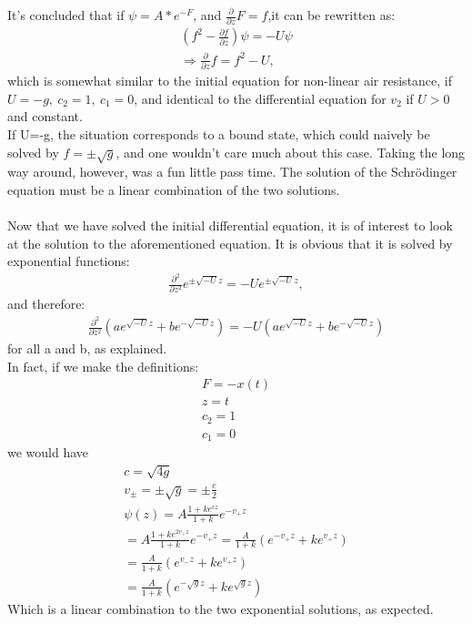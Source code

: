 \documentclass[english,a4paper,oneside,article,9pt]{memoir}
\begin{document}
It's concluded that if $\psi=A*e^{-F}$, and $\frac{\partial}{\partial z}F=f$,it can be rewritten as:
\begin{align*}
(f^2-\frac{\partial f}{\partial z})\psi=-U\psi\\
\Rightarrow \frac{\partial}{\partial z}f=f^2-U,
\end{align*}
which is somewhat similar to the initial equation for non-linear air resistance, if $U=-g,\ c_2=1,\ c_1=0$, and identical to the differential equation for $v_2$ if $U>0$ and constant.\\
If U=-g, the situation corresponds to a bound state, which could naively be solved by $f=\pm\sqrt{g}$, and one wouldn't care much about this case. Taking the long way around, however, was a fun little pass time. The solution of the Schrödinger equation must be a linear combination of the two solutions.\\
\\
Now that we have solved the initial differential equation, it is of interest to look at the solution to the aforementioned equation. It is obvious that it is solved by exponential functions:
\begin{align*}
\frac{\partial^2}{\partial z^2}e^{\pm\sqrt{-U}z}=-Ue^{\pm\sqrt{-U}z},
\end{align*}
and therefore:
\begin{align*}
\frac{\partial^2}{\partial z^2}(ae^{\sqrt{-U}z}+be^{-\sqrt{-U}z})=-U(ae^{\sqrt{-U}z}+be^{-\sqrt{-U}z})
\end{align*}
for all a and b, as explained.
\\
In fact, if we make the definitions:
\begin{align*}
F=-x(t)\\
z=t\\
c_2=1\\
c_1=0
\end{align*}
we would have
\begin{align*}
c=\sqrt{4g}\\
v_\pm=\pm\sqrt{g}=\pm\frac{c}{2}\\
\psi(z)=A\frac{1+ke^{cz}}{1+k}e^{-v_+z}\\
=A\frac{1+ke^{2v_+z}}{1+k}e^{-v_+z}=\frac{A}{1+k}(e^{-v_+z}+ke^{v_+z})\\
=\frac{A}{1+k}(e^{v_-z}+ke^{v_+z})\\
=\frac{A}{1+k}(e^{-\sqrt{g}z}+ke^{\sqrt{g}z})
\end{align*}
Which is a linear combination to the two exponential solutions, as expected.
\end{document}
